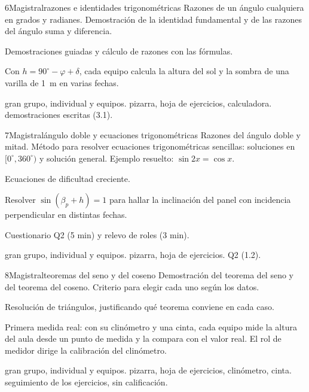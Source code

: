 \begin{sesionbox}{6}{Magistral}{razones e identidades trigonométricas}
 Razones de un ángulo cualquiera en grados y radianes. Demostración de la identidad fundamental y de las razones del ángulo suma y diferencia.

 Demostraciones guiadas y cálculo de razones con las fórmulas.

 Con $h=90^\circ-\varphi+\delta$, cada equipo calcula la altura del sol y la sombra de una varilla de 1~m en varias fechas.

 gran grupo, individual y equipos.  pizarra, hoja de ejercicios, calculadora.  demostraciones escritas (3.1).
\end{sesionbox}

\begin{sesionbox}{7}{Magistral}{ángulo doble y ecuaciones trigonométricas}
 Razones del ángulo doble y mitad. Método para resolver ecuaciones trigonométricas sencillas: soluciones en $[0^\circ,360^\circ)$ y solución general. Ejemplo resuelto: $\sin 2x=\cos x$.

 Ecuaciones de dificultad creciente.

 Resolver $\sin(\beta_p+h)=1$ para hallar la inclinación del panel con incidencia perpendicular en distintas fechas.

 Cuestionario Q2 (5 min) y relevo de roles (3 min).

 gran grupo, individual y equipos.  pizarra, hoja de ejercicios.  Q2 (1.2).
\end{sesionbox}

\begin{sesionbox}{8}{Magistral}{teoremas del seno y del coseno}
 Demostración del teorema del seno y del teorema del coseno. Criterio para elegir cada uno según los datos.

 Resolución de triángulos, justificando qué teorema conviene en cada caso.

 Primera medida real: con su clinómetro y una cinta, cada equipo mide la altura del aula desde un punto de medida y la compara con el valor real. El rol de medidor dirige la calibración del clinómetro.

 gran grupo, individual y equipos.  pizarra, hoja de ejercicios, clinómetro, cinta.  seguimiento de los ejercicios, sin calificación.
\end{sesionbox}

